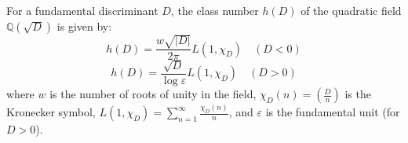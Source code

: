 For a fundamental discriminant $D$, the class number $h(D)$ of the quadratic field $\mathbb{Q}(\sqrt{D})$ is given by:
$$h(D) = \frac{w\sqrt{|D|}}{2\pi} L(1, \chi_D) \quad (D < 0)$$
$$h(D) = \frac{\sqrt{D}}{\log \varepsilon} L(1, \chi_D) \quad (D > 0)$$
where $w$ is the number of roots of unity in the field, $\chi_D(n) = \left(\frac{D}{n}\right)$ is the Kronecker symbol, $L(1, \chi_D) = \sum_{n=1}^{\infty} \frac{\chi_D(n)}{n}$, and $\varepsilon$ is the fundamental unit (for $D > 0$).
